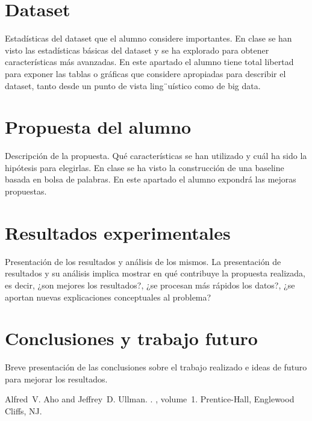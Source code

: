 \documentclass[11pt,a4paper]{article}
\begin{document}
\section{Dataset}

Estad\'isticas del dataset que el alumno considere importantes. En clase se han visto las estad\'isticas b\'asicas del dataset y se ha explorado para obtener caracter\'isticas m\'as avanzadas. En este apartado el alumno tiene total libertad para exponer las tablas o gr\'aficas que considere apropiadas para describir el dataset, tanto desde un punto de vista ling¨u\'istico como de big data. 


\section{Propuesta del alumno}

Descripci\'on de la propuesta. Qu\'e caracter\'isticas se han utilizado y cu\'al ha sido la hip\'otesis para elegirlas. En clase se ha visto la construcci\'on de una baseline basada en bolsa de palabras. En este apartado el alumno expondr\'a las mejoras propuestas.

\section{Resultados experimentales}

Presentaci\'on de los resultados y an\'alisis de los mismos. La presentaci\'on de resultados y su an\'alisis implica mostrar en qu\'e contribuye la propuesta realizada, es decir, ¿son mejores los resultados?, ¿se procesan m\'as r\'apidos los datos?, ¿se aportan nuevas explicaciones conceptuales al problema?

\section{Conclusiones y trabajo futuro}

Breve presentaci\'on de las conclusiones sobre  el trabajo realizado e ideas de futuro para mejorar los resultados.


\begin{thebibliography}{}

Alfred~V. Aho and Jeffrey~D. Ullman.
.
, volume~1.
\newblock Prentice-{Hall}, Englewood Cliffs, NJ.

\end{thebibliography}
\end{document}
